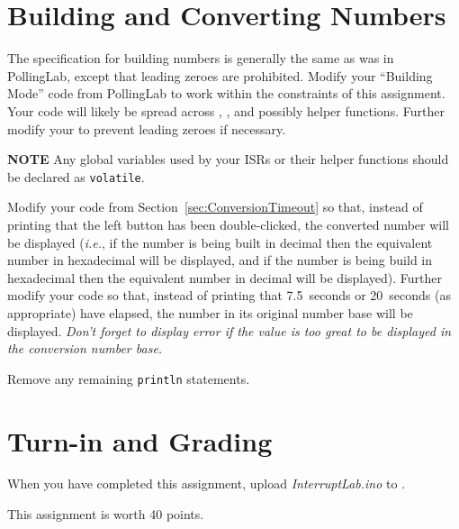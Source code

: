 \section{Building and Converting Numbers}\label{sec:BuildingAndConverting}

The specification for building numbers is generally the same as was in
PollingLab, except that leading zeroes are prohibited. Modify your ``Building
Mode'' code from PollingLab to work within the constraints of this assignment.
Your code will likely be spread across ,
, and possibly helper functions. Further modify
your to prevent leading zeroes if necessary.

\textbf{NOTE} Any global variables used by your ISRs or their helper functions
should be declared as \lstinline{volatile}.

Modify your code from Section~\ref{sec:ConversionTimeout} so that, instead of
printing that the left button has been double-clicked, the converted number will
be displayed (\textit{i.e.}, if the number is being built in decimal then the
equivalent number in hexadecimal will be displayed, and if the number is being
build in hexadecimal then the equivalent number in decimal will be displayed).
Further modify your code so that, instead of printing that 7.5~seconds or
20~seconds (as appropriate) have elapsed, the number in its original number base
will be displayed. \textit{Don't forget to display {\dviiseg error} if the value
is too great to be displayed in the conversion number base.}

Remove any remaining \lstinline{println} statements.

\section*{Turn-in and Grading}

When you have completed this assignment, upload \textit{InterruptLab.ino} to
\filesubmission.

This assignment is worth 40 points. \\

